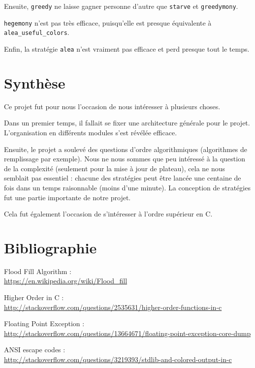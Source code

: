 \documentclass[12pt]{article}
\def\sec#1{\section{#1}}
\begin{document}
Ensuite, \texttt{greedy} ne laisse gagner personne d'autre que \texttt{starve} et \texttt{greedymony}.

\texttt{hegemony} n'est pas très efficace, puisqu'elle est presque équivalente à \texttt{alea\_useful\_colors}.

Enfin, la stratégie \texttt{alea} n'est vraiment pas efficace et perd presque tout le temps.

\sec{Synthèse}
Ce projet fut pour nous l'occasion de nous intéresser à plusieurs choses.

Dans un premier temps, il fallait se fixer une architecture générale pour le projet. L'organisation en différents modules s'est révélée efficace.

Ensuite, le projet a soulevé des questions d'ordre algorithmiques (algorithmes de remplissage par exemple). Nous ne nous sommes que peu intéressé à la question de la complexité (seulement pour la mise à jour de plateau), cela ne nous semblait pas essentiel : chacune des stratégies peut être lancée une centaine de fois dans un temps raisonnable (moins d'une minute). La conception de stratégies fut une partie importante de notre projet.

Cela fut également l'occasion de s'intéresser à l'ordre supérieur en C.



\sec{Bibliographie}

Flood Fill Algorithm : \\ \url{https://en.wikipedia.org/wiki/Flood_fill}

Higher Order in C : \\ \url{http://stackoverflow.com/questions/2535631/higher-order-functions-in-c}

Floating Point Exception : \\ \url{http://stackoverflow.com/questions/13664671/floating-point-exception-core-dump}

ANSI escape codes : \\ \url{http://stackoverflow.com/questions/3219393/stdlib-and-colored-output-in-c}
\end{document}
